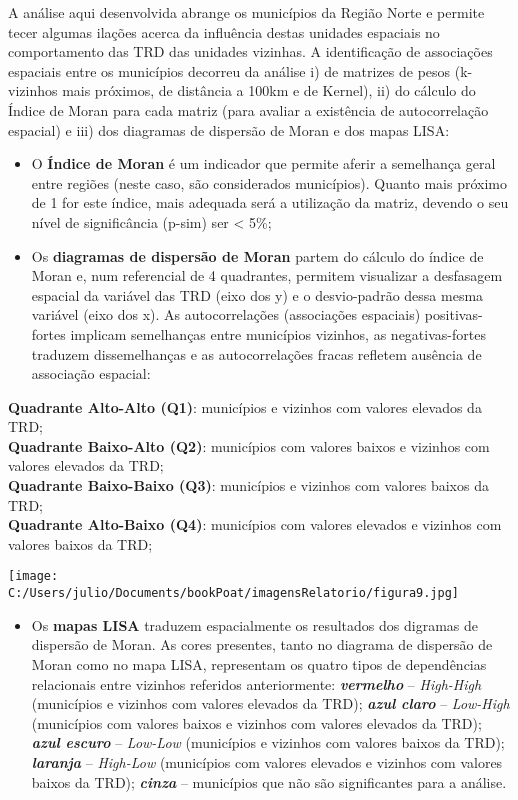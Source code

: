 \documentclass[
]{book}
\providecommand{\tightlist}{%
  \setlength{\itemsep}{0pt}\setlength{\parskip}{0pt}}
\begin{document}
A análise aqui desenvolvida abrange os municípios da Região Norte e permite tecer algumas ilações acerca da influência destas unidades espaciais no comportamento das TRD das unidades vizinhas. A identificação de associações espaciais entre os municípios decorreu da análise i) de matrizes de pesos (k-vizinhos mais próximos, de distância a 100km e de Kernel), ii) do cálculo do Índice de Moran para cada matriz (para avaliar a existência de autocorrelação espacial) e iii) dos diagramas de dispersão de Moran e dos mapas LISA:

\begin{itemize}
\tightlist
\item
  O \textbf{Índice de Moran} é um indicador que permite aferir a semelhança geral entre regiões (neste caso, são considerados municípios). Quanto mais próximo de 1 for este índice, mais adequada será a utilização da matriz, devendo o seu nível de significância (p-sim) ser \textless{} 5\%;
\item
  Os \textbf{diagramas de dispersão de Moran} partem do cálculo do índice de Moran e, num referencial de 4 quadrantes, permitem visualizar a desfasagem espacial da variável das TRD (eixo dos y) e o desvio-padrão dessa mesma variável (eixo dos x). As autocorrelações (associações espaciais) positivas-fortes implicam semelhanças entre municípios vizinhos, as negativas-fortes traduzem dissemelhanças e as autocorrelações fracas refletem ausência de associação espacial:
\end{itemize}

\textbf{Quadrante Alto-Alto (Q1)}: municípios e vizinhos com valores elevados da TRD;\\
\textbf{Quadrante Baixo-Alto (Q2)}: municípios com valores baixos e vizinhos com valores elevados da TRD;\\
\textbf{Quadrante Baixo-Baixo (Q3)}: municípios e vizinhos com valores baixos da TRD;\\
\textbf{Quadrante Alto-Baixo (Q4)}: municípios com valores elevados e vizinhos com valores baixos da TRD;

\texttt{[image: C:/Users/julio/Documents/bookPoat/imagensRelatorio/figura9.jpg]}

\begin{itemize}
\tightlist
\item
  Os \textbf{mapas LISA} traduzem espacialmente os resultados dos digramas de dispersão de Moran. As cores presentes, tanto no diagrama de dispersão de Moran como no mapa LISA, representam os quatro tipos de dependências relacionais entre vizinhos referidos anteriormente: \textbf{\emph{vermelho}} -- \emph{High-High} (municípios e vizinhos com valores elevados da TRD); \textbf{\emph{azul claro}} -- \emph{Low-High} (municípios com valores baixos e vizinhos com valores elevados da TRD); \textbf{\emph{azul escuro}} -- \emph{Low-Low} (municípios e vizinhos com valores baixos da TRD); \textbf{\emph{laranja}} -- \emph{High-Low} (municípios com valores elevados e vizinhos com valores baixos da TRD); \textbf{\emph{cinza}} -- municípios que não são significantes para a análise.
\end{itemize}
\end{document}
